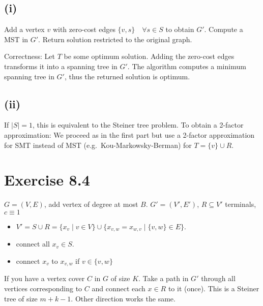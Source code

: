 \documentclass[oneside,a4paper]{amsart}
\begin{document}
\subsection*{(i)}
Add a vertex $v$ with zero-cost edges $\{ v, s \} \quad \forall s \in S$ to obtain $G'$. Compute a MST in $G'$.
Return solution restricted to the original graph.

Correctness: Let $T$ be some optimum solution. Adding the zero-cost edges transforms it into a spanning tree in $G'$. The algorithm computes a minimum spanning tree in $G'$, thus the returned solution is optimum.
\subsection*{(ii)}
If $|S| = 1$, this is equivalent to the Steiner tree problem. To obtain a 2-factor approximation: We proceed as in the first part but use a 2-factor approximation for SMT instead of MST (e.g.\ Kou-Markowsky-Berman) for $T = \{v\} \cup R$.
\section*{Exercise 8.4}
$G = (V, E)$, add vertex of degree at most $B$.
$G' = (V', E')$, $R \subseteq V'$ terminals, $c \equiv 1$
\begin{itemize}
\item $V' = S \cup R = \{ x_v \mid v \in V\} \cup \{ x_{v,w} = x_{w,v} \mid \{v,w\} \in E\}$.
\item connect all $x_v \in S$.
\item connect $x_v$ to $x_{v,w}$ if $v \in \{ v, w \}$
\end{itemize}
If you have a vertex cover $C$ in $G$ of size $K$. Take a path in $G'$ through all vertices corresponding to $C$ and connect each $x \in R$ to it (once). This is a Steiner tree of size $m + k - 1$. Other direction works the same.
\end{document}
